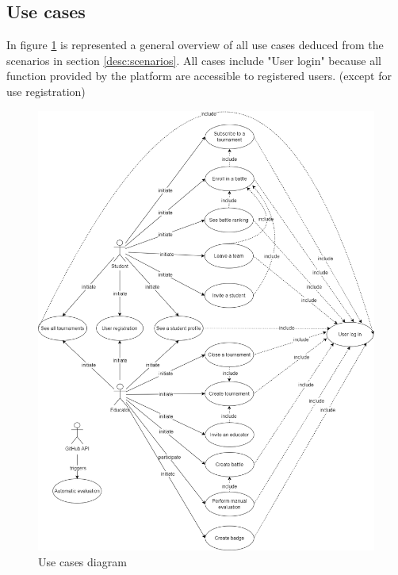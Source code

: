     \clearpage
    
    \subsection{Use cases}
    In figure \ref{fig:use_cases_diagram} is represented a general overview of all use cases deduced from the scenarios in section \ref{desc:scenarios}. All cases include "User login" because all function provided by the platform are accessible to registered users. (except for use registration)
    \begin{figure}[H]
        \centering
        \includegraphics[scale=0.35]{images/use_cases_diagram.png}
        \caption{Use cases diagram}
        \label{fig:use_cases_diagram}
    \end{figure}
    \clearpage
    
